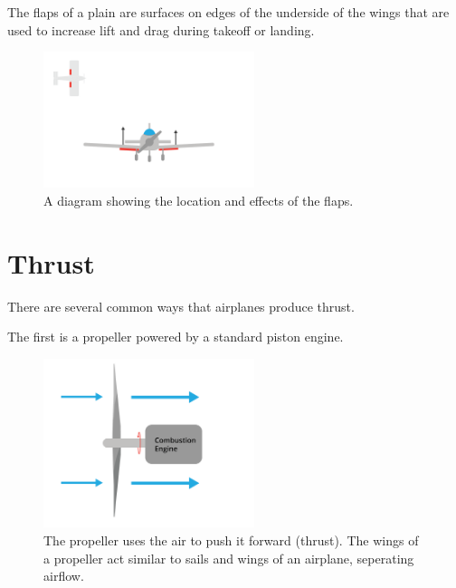 The flaps of a plain are surfaces on edges of the underside of the wings that are used to increase lift and drag during takeoff or landing.

\begin{figure}[H]
    \centering
    \includegraphics[width=0.55\textwidth]{flaps.png}
    \caption{A diagram showing the location and effects of the flaps.}
    \label{fig:flaps}
\end{figure}



\section{Thrust}

There are several common ways that airplanes produce thrust.

The first is a propeller powered by a standard piston engine.
\begin{figure}[H]
    \centering
    \includegraphics[width=0.55\textwidth]{propeller.png}
    \caption{The propeller uses the air to push it forward (thrust). The wings of a propeller act similar to sails and wings of an airplane, seperating airflow.}
    \label{fig:propeller}
\end{figure}



